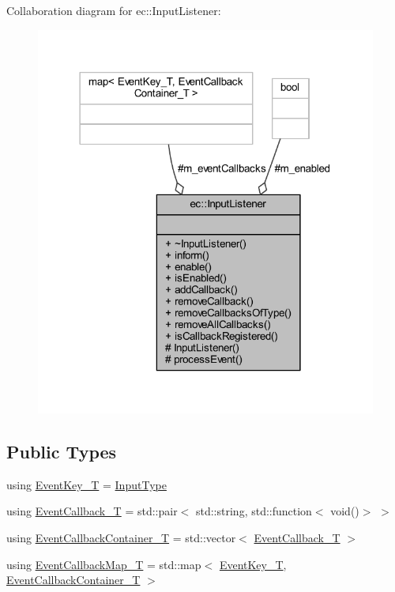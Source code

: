 Collaboration diagram for ec\+:\+:Input\+Listener\+:\nopagebreak
\begin{figure}[H]
\begin{center}
\leavevmode
\includegraphics[width=318pt]{classec_1_1_input_listener__coll__graph}
\end{center}
\end{figure}
\subsection*{Public Types}
\begin{DoxyCompactItemize}
\item 
using \mbox{\hyperlink{classec_1_1_input_listener_a741cc6a2d59a823b5bfbc4e48e1a147f}{Event\+Key\+\_\+T}} = \mbox{\hyperlink{namespaceec_a5de6bdb8c4b2ed6e590e721ec998f964}{Input\+Type}}
\item 
using \mbox{\hyperlink{classec_1_1_input_listener_a6d62bd83a0cb80c979711d26722c8c6d}{Event\+Callback\+\_\+T}} = std\+::pair$<$ std\+::string, std\+::function$<$ void()$>$ $>$
\item 
using \mbox{\hyperlink{classec_1_1_input_listener_a3bb7086fdca1d1a76428b1e737e9e002}{Event\+Callback\+Container\+\_\+T}} = std\+::vector$<$ \mbox{\hyperlink{classec_1_1_input_listener_a6d62bd83a0cb80c979711d26722c8c6d}{Event\+Callback\+\_\+T}} $>$
\item 
using \mbox{\hyperlink{classec_1_1_input_listener_a13553604a5ae8c32fa95d304206aa01a}{Event\+Callback\+Map\+\_\+T}} = std\+::map$<$ \mbox{\hyperlink{namespaceec_a5de6bdb8c4b2ed6e590e721ec998f964}{Event\+Key\+\_\+T}}, \mbox{\hyperlink{classec_1_1_input_listener_a3bb7086fdca1d1a76428b1e737e9e002}{Event\+Callback\+Container\+\_\+T}} $>$
\end{DoxyCompactItemize}
